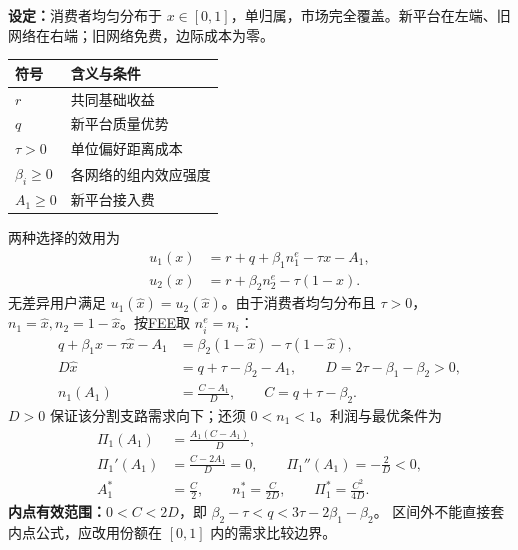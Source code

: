 \label{kp:new-network}
\textbf{设定：}消费者均匀分布于 $x\in[0,1]$，单归属，市场完全覆盖。新平台在左端、旧网络在右端；旧网络免费，边际成本为零。
\begin{center}
{\small\begin{tabular}{ll}
\toprule
符号 & 含义与条件\\
\midrule
$r$ & 共同基础收益\\
$q$ & 新平台质量优势\\
$\tau>0$ & 单位偏好距离成本\\
$\beta_i\ge0$ & 各网络的组内效应强度\\
$A_1\ge0$ & 新平台接入费\\
\bottomrule
\end{tabular}}
\end{center}
\begin{center}
\end{center}
\begin{proofbox}[title=需求与利润的推导]
两种选择的效用为
\begin{align*}
u_1(x)&=r+q+\beta_1n_1^e-\tau x-A_1,\\
u_2(x)&=r+\beta_2n_2^e-\tau(1-x).
\end{align*}
无差异用户满足 $u_1(\hat x)=u_2(\hat x)$。由于消费者均匀分布且 $\tau>0$，$n_1=\hat x,n_2=1-\hat x$。按\hyperref[kp:fee]{FEE}取 $n_i^e=n_i$：
\begin{align*}
q+\beta_1\hat x-\tau\hat x-A_1
  &=\beta_2(1-\hat x)-\tau(1-\hat x),\\
D\hat x&=q+\tau-\beta_2-A_1,\qquad D=2\tau-\beta_1-\beta_2>0,\\
n_1(A_1)&=\frac{C-A_1}{D},\qquad C=q+\tau-\beta_2.
\end{align*}
$D>0$ 保证该分割支路需求向下；还须 $0<n_1<1$。利润与最优条件为
\begin{align*}
\Pi_1(A_1)&=\frac{A_1(C-A_1)}D,\\
\Pi_1'(A_1)&=\frac{C-2A_1}D=0,\qquad
\Pi_1''(A_1)=-\frac2D<0,\\
A_1^*&=\frac C2,\qquad n_1^*=\frac C{2D},\qquad
\Pi_1^*=\frac{C^2}{4D}.
\end{align*}
\textbf{内点有效范围：}$0<C<2D$，即
$\beta_2-\tau<q<3\tau-2\beta_1-\beta_2$。
区间外不能直接套内点公式，应改用份额在 $[0,1]$ 内的需求比较边界。
\end{proofbox}
